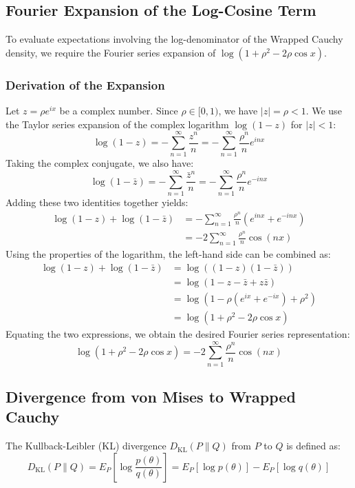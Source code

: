 \documentclass[11pt,a4paper]{article}
\begin{document}
\subsection{Fourier Expansion of the Log-Cosine Term}
To evaluate expectations involving the log-denominator of the Wrapped Cauchy density, we require the Fourier series expansion of $\log(1 + \rho^2 - 2\rho\cos x)$.

\subsubsection{Derivation of the Expansion}
Let $z = \rho e^{ix}$ be a complex number. Since $\rho \in [0, 1)$, we have $|z| = \rho < 1$. We use the Taylor series expansion of the complex logarithm $\log(1 - z)$ for $|z| < 1$:
\begin{equation}
\log(1 - z) = -\sum_{n=1}^\infty \frac{z^n}{n} = -\sum_{n=1}^\infty \frac{\rho^n}{n} e^{inx}
\end{equation}
Taking the complex conjugate, we also have:
\begin{equation}
\log(1 - \bar{z}) = -\sum_{n=1}^\infty \frac{\bar{z}^n}{n} = -\sum_{n=1}^\infty \frac{\rho^n}{n} e^{-inx}
\end{equation}
Adding these two identities together yields:
\begin{align}
\log(1 - z) + \log(1 - \bar{z}) &= -\sum_{n=1}^\infty \frac{\rho^n}{n} \left( e^{inx} + e^{-inx} \right) \nonumber \\
&= -2 \sum_{n=1}^\infty \frac{\rho^n}{n} \cos(nx)
\end{align}
Using the properties of the logarithm, the left-hand side can be combined as:
\begin{align}
\log(1 - z) + \log(1 - \bar{z}) &= \log((1 - z)(1 - \bar{z})) \nonumber \\
&= \log(1 - z - \bar{z} + z\bar{z}) \nonumber \\
&= \log(1 - \rho(e^{ix} + e^{-ix}) + \rho^2) \nonumber \\
&= \log(1 + \rho^2 - 2\rho\cos x)
\end{align}
Equating the two expressions, we obtain the desired Fourier series representation:
\begin{equation}
\log(1 + \rho^2 - 2\rho\cos x) = -2 \sum_{n=1}^\infty \frac{\rho^n}{n} \cos(nx)
\end{equation}


\subsection{Divergence from von Mises to Wrapped Cauchy}
The Kullback-Leibler (KL) divergence $D_{\text{KL}}(P \parallel Q)$ from $P$ to $Q$ is defined as:
\begin{equation}
D_{\text{KL}}(P \parallel Q) = E_P\left[ \log \frac{p(\theta)}{q(\theta)} \right] = E_P[\log p(\theta)] - E_P[\log q(\theta)]
\end{equation}
\end{document}
